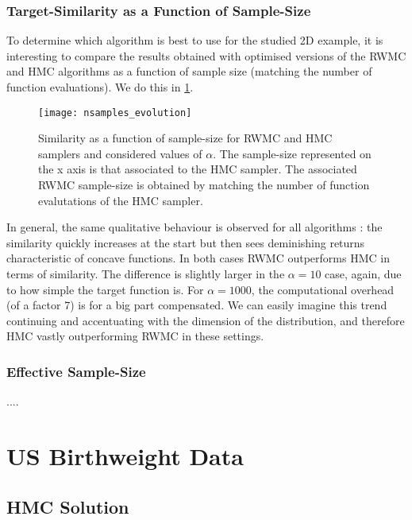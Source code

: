 \documentclass[a4paper, 12pt,oneside]{article}
\begin{document}
		\subsubsection{Target-Similarity as a Function of Sample-Size}
		To determine which algorithm is best to use for the studied 2D example, it is interesting to compare the results obtained with optimised versions of the RWMC and HMC algorithms as a function of sample size (matching the number of function evaluations). We do this in \ref{fig:nsamples-evolution}.
		\begin{figure}[htb]
			\centering
				\vspace{0em}
				\texttt{[image: nsamples\_evolution]}
				\caption{Similarity as a function of sample-size for RWMC and HMC samplers and considered values of $\alpha$. The sample-size represented on the x axis is that associated to the HMC sampler. The associated RWMC sample-size is obtained by matching the number of function evalutations of the HMC sampler.}
				\label{fig:nsamples-evolution}
		\end{figure}
		In general, the same qualitative behaviour is observed for all algorithms : the similarity quickly increases at the start but then sees deminishing returns characteristic of concave functions. In both cases RWMC outperforms HMC in terms of similarity. The difference is slightly larger in the $\alpha=10$ case, again, due to how simple the target function is. For $\alpha=1000$, the computational overhead (of a factor 7) is for a big part compensated. We can easily imagine this trend continuing and accentuating with the dimension of the distribution, and therefore HMC vastly outperforming RWMC in these settings.
		\subsubsection{Effective Sample-Size}
		....
	\section{US Birthweight Data}
		\subsection{HMC Solution}
\end{document}
